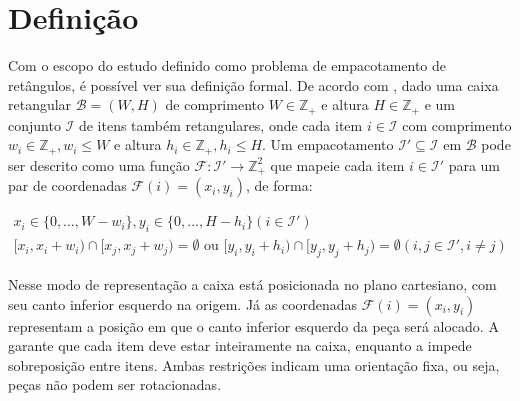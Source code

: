 \section{Definição}\label{sec:definicao}

Com o escopo do estudo definido como problema de empacotamento de retângulos, é possível ver sua
definição formal.
De acordo com , dado uma caixa retangular $\mathcal{B} = (W, H)$ de
comprimento $W \in \mathbb{Z}_+$ e altura $H \in \mathbb{Z}_+$ e um conjunto $\mathcal{I}$ de itens
também retangulares, onde cada item $i \in \mathcal{I}$ com comprimento $w_i \in \mathbb{Z}_+, w_i \le W$
e altura $h_i \in \mathbb{Z}_+, h_i \le H$.
Um empacotamento $\mathcal{I}' \subseteq \mathcal{I}$ em $\mathcal{B}$ pode ser descrito como uma função
$\mathcal{F}: \mathcal{I}' \to \mathbb{Z}_+^2$ que mapeie cada item $i \in \mathcal{I}'$ para um par
de coordenadas $\mathcal{F}(i) = (x_i, y_i)$, de forma:

    {\small
\begin{align}
    x_i \in \{0, \dots, W - w_i\}, y_i \in \{0, \dots, H - h_i\} \left(i \in \mathcal{I}'\right) \label{eq:1} \\
    [x_i, x_i + w_i) \cap [x_j, x_j + w_j) = \emptyset \text{ ou } [y_i, y_i + h_i) \cap [y_j, y_j + h_j) = \emptyset \left(i, j \in \mathcal{I}', i \neq j\right) \label{eq:2}
\end{align}
}

Nesse modo de representação a caixa está posicionada no plano cartesiano, com seu canto inferior
esquerdo na origem.
Já as coordenadas $\mathcal{F}(i) = (x_i, y_i)$ representam a posição em que o canto inferior
esquerdo da peça será alocado.
A  garante que cada item deve estar inteiramente na caixa, enquanto a 
impede sobreposição entre itens.
Ambas restrições indicam uma orientação fixa, ou seja, peças não podem ser rotacionadas.
